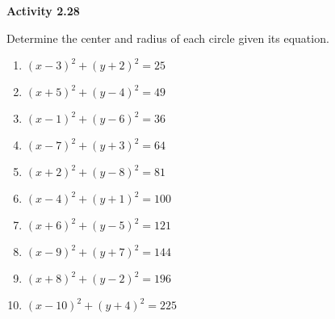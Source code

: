 \vspace{0.3ex}
\noindent\textbf{Activity 2.28}

\vspace{0.2ex}

Determine the center and radius of each circle given its equation.
\begin{multicols}{2}
\begin{enumerate}
    \item $(x - 3)^2 + (y + 2)^2 = 25$
    \item $(x + 5)^2 + (y - 4)^2 = 49$
    \item $(x - 1)^2 + (y - 6)^2 = 36$
    \item $(x - 7)^2 + (y + 3)^2 = 64$
    \item $(x + 2)^2 + (y - 8)^2 = 81$
    \item $(x - 4)^2 + (y + 1)^2 = 100$
    \item $(x + 6)^2 + (y - 5)^2 = 121$
    \item $(x - 9)^2 + (y + 7)^2 = 144$
    \item $(x + 8)^2 + (y - 2)^2 = 196$
    \item $(x - 10)^2 + (y + 4)^2 = 225$
\end{enumerate}
\end{multicols}
